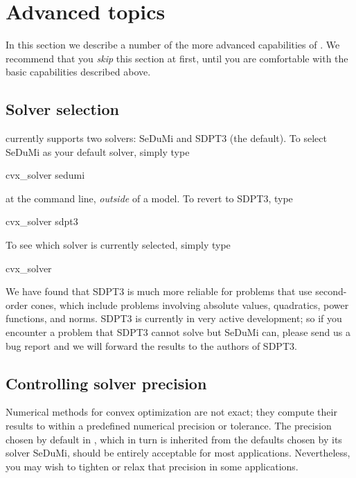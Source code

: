 \documentclass[12pt]{article}
\begin{document}
\newpage
\section{Advanced topics}

In this section we describe a number of the more advanced capabilities of \cvx.
We recommend that you \emph{skip} this section at first, until you are comfortable
with the basic capabilities described above.


\subsection{Solver selection}
\label{sec:solver}

\cvx currently supports two solvers: SeDuMi and SDPT3 (the default).
To select SeDuMi as your default solver, simply type
\begin{code2}
	cvx_solver sedumi
\end{code2}
at the command line, \emph{outside} of a \cvx model. To revert to SDPT3, type
\begin{code2}
	cvx_solver sdpt3
\end{code2}
To see which solver is currently selected, simply type
\begin{code2}
	cvx_solver
\end{code2}
We have found that SDPT3 is much more reliable for problems that 
use second-order cones, which include problems involving
absolute values, quadratics, power functions, and norms.  SDPT3 is
currently in very active development; so if you
encounter a problem that SDPT3 cannot solve but SeDuMi can, 
please send us a bug report and we will forward the results to
the authors of SDPT3.

\subsection{Controlling solver precision}
\label{sec:precision}

Numerical methods for convex optimization are not exact; they compute their results
to within a predefined numerical precision or tolerance. The precision chosen by default in \cvx,
which in turn is inherited from the defaults chosen by its solver SeDuMi, should
be entirely acceptable for most applications. Nevertheless, you may wish to tighten
or relax that precision in some applications.
\end{document}
